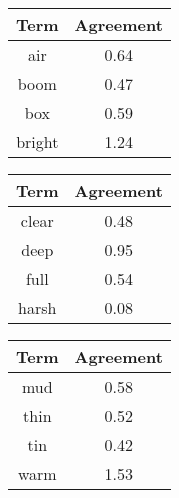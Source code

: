 \begin{tabular}{|c|c|}
	\hline
	\bf{Term} & \bf{Agreement} \tabularnewline
	\hline
	\hline
	air & 0.64 \tabularnewline
	\hline
	boom & 0.47 \tabularnewline
	\hline
	box & 0.59 \tabularnewline
	\hline
	bright & 1.24 \tabularnewline
	\hline
\end{tabular}
\qquad
\begin{tabular}{|c|c|}
	\hline
	\bf{Term} & \bf{Agreement} \tabularnewline
	\hline
	\hline
	clear & 0.48 \tabularnewline
	\hline
	deep & 0.95 \tabularnewline
	\hline
	full & 0.54 \tabularnewline
	\hline
	harsh & 0.08 \tabularnewline
	\hline
\end{tabular}
\qquad
\begin{tabular}{|c|c|}
	\hline
	\bf{Term} & \bf{Agreement} \tabularnewline
	\hline
	\hline
	mud & 0.58 \tabularnewline
	\hline
	thin & 0.52 \tabularnewline
	\hline
	tin & 0.42 \tabularnewline
	\hline
	warm & 1.53 \tabularnewline
	\hline
\end{tabular}
